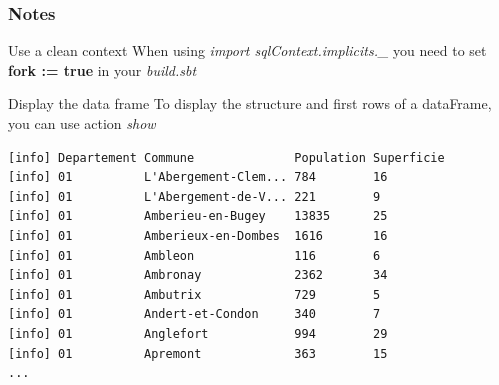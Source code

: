 \documentclass[slidetop,9pt,utf8]{beamer}
\begin{document}
\begin{frame}[fragile]
  \frametitle{Notes}

  \begin{exampleblock}{Use a clean context}
    When using \textit{import sqlContext.implicits.\_} you need to set \textbf{fork := true} in your \textit{build.sbt}
  \end{exampleblock}

  \begin{exampleblock}{Display the data frame}
    To display the structure and first rows of a dataFrame, you can use action \textit{show}
  \end{exampleblock}

  \begin{lstlisting}[label=ResultOfShowMethod, caption=Result of Show Method, style=terminal]
[info] Departement Commune              Population Superficie
[info] 01          L'Abergement-Clem... 784        16        
[info] 01          L'Abergement-de-V... 221        9         
[info] 01          Amberieu-en-Bugey    13835      25        
[info] 01          Amberieux-en-Dombes  1616       16        
[info] 01          Ambleon              116        6         
[info] 01          Ambronay             2362       34        
[info] 01          Ambutrix             729        5         
[info] 01          Andert-et-Condon     340        7         
[info] 01          Anglefort            994        29        
[info] 01          Apremont             363        15             
...
  \end{lstlisting}

\end{frame}
\end{document}
